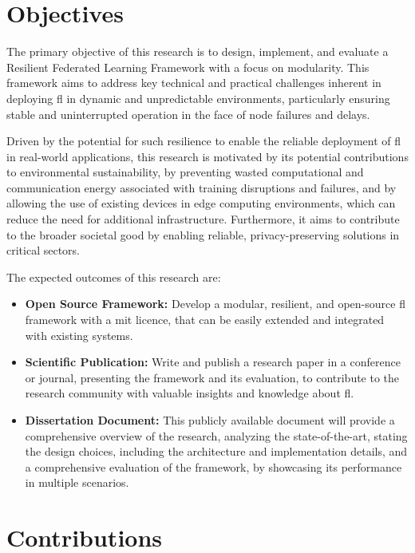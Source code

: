 \section{Objectives}
\label{sec:objectives}

The primary objective of this research is to design, implement, and evaluate a Resilient Federated Learning Framework with a focus on modularity. This framework aims to address key technical and practical challenges inherent in deploying \ac{fl} in dynamic and unpredictable environments, particularly ensuring stable and uninterrupted operation in the face of node failures and delays. 

Driven by the potential for such resilience to enable the reliable deployment of \ac{fl} in real-world applications, this research is motivated by its potential contributions to environmental sustainability, by preventing wasted computational and communication energy associated with training disruptions and failures, and by allowing the use of existing devices in edge computing environments, which can reduce the need for additional infrastructure. Furthermore, it aims to contribute to the broader societal good by enabling reliable, privacy-preserving solutions in critical sectors.

The expected outcomes of this research are:

\begin{itemize}
    \item \textbf{Open Source Framework:} Develop a modular, resilient, and open-source \ac{fl} framework with a \ac{mit} licence, that can be easily extended and integrated with existing systems.
    \item \textbf{Scientific Publication:} Write and publish a research paper in a conference or journal, presenting the framework and its evaluation, to contribute to the research community with valuable insights and knowledge about \ac{fl}.
    \item \textbf{Dissertation Document:} This publicly available document will provide a comprehensive overview of the research, analyzing the state-of-the-art, stating the design choices, including the architecture and implementation details, and a comprehensive evaluation of the framework, by showcasing its performance in multiple scenarios.
\end{itemize}

\section{Contributions}
\label{sec:contributions}

